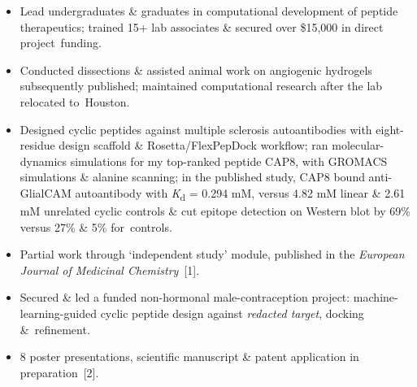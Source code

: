 \begin{itemize}
  \item Lead undergraduates \& graduates in computational development of peptide therapeutics; trained 15+ lab associates \& secured over \$15,000 in direct \cvkeep{}project~\cvlast{}funding.\cvkeepend{}
  \item Conducted dissections \& assisted animal work on angiogenic hydrogels subsequently published; maintained computational research after the lab relocated \cvkeep{}to~\cvlast{}Houston.\cvkeepend{}
\end{itemize}
\begin{itemize}
  \item Designed cyclic peptides against multiple sclerosis autoantibodies with eight-residue design scaffold \& Rosetta/FlexPepDock workflow; ran molecular-dynamics simulations for my top-ranked peptide CAP8, with GROMACS simulations \& alanine scanning; in the published study, CAP8 bound anti-GlialCAM autoantibody with \textit{K}\textsubscript{d} = 0.294 mM, versus 4.82 mM linear \& 2.61 mM unrelated cyclic controls \& cut epitope detection on Western blot by 69\% versus 27\% \& 5\% \cvkeep{}for~\cvlast{}controls.\cvkeepend{}
  \item Partial work through `independent study' module, published in the \textit{European Journal of Medicinal \cvkeep{}Chemistry}~\cvlast{}[1].\cvkeepend{}
\end{itemize}
\begin{itemize}
  \item Secured \& led a funded non-hormonal male-contraception project: machine-learning-guided cyclic peptide design against \textit{redacted target}, docking \cvkeep{}\&~\cvlast{}refinement.\cvkeepend{}
  \item 8 poster presentations, scientific manuscript \& patent application in \cvkeep{}preparation~\cvlast{}[2].\cvkeepend{}
\end{itemize}
